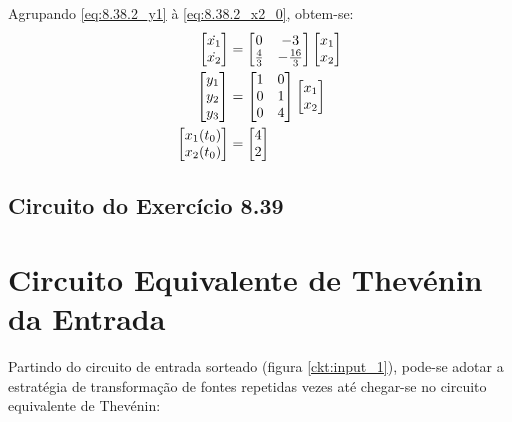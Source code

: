 \documentclass{report}
\let\oldsection\section
\renewcommand\section{\clearpage\oldsection}
\begin{document}
Agrupando \ref{eq:8.38.2_y1} à \ref{eq:8.38.2_x2_0}, obtem-se:
\begin{equation}
      \label{eq:8.38.2_sol}
      \centering
      \begin{split}
          \begin{bmatrix} \dot{x_1} \\ \dot{x_2} \end{bmatrix} &= \begin{bmatrix} 0 & -3 \\ \frac{4}{3} & -\frac{16}{3} \end{bmatrix}
          \begin{bmatrix} x_1 \\ x_2 \end{bmatrix} \\
          \begin{bmatrix} y_1 \\ y_2 \\ y_3 \end{bmatrix} &= \begin{bmatrix} 1 & 0 \\ 0 & 1 \\ 0 & 4 \end{bmatrix}
          \begin{bmatrix} x_1 \\ x_2 \end{bmatrix} \\
          \begin{bmatrix} x_1(t_0) \\ x_2(t_0) \end{bmatrix} &= \begin{bmatrix} 4 \\ 2 \end{bmatrix}
      \end{split}
\end{equation}

\subsection{Circuito do Exercício 8.39}

\section{Circuito Equivalente de Thevénin da Entrada}

Partindo do circuito de entrada sorteado (figura \ref{ckt:input_1}), pode-se adotar a estratégia de transformação de fontes repetidas vezes até
chegar-se no circuito equivalente de Thevénin:
\end{document}
